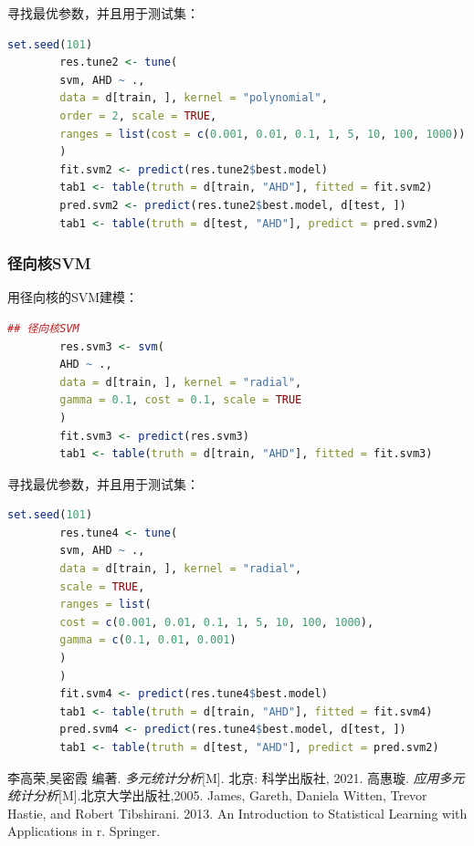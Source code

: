 \documentclass[12pt, a4paper, oneside]{ctexart}
\begin{document}
	寻找最优参数，并且用于测试集：
	\begin{lstlisting}[language=R]
		set.seed(101)
		res.tune2 <- tune(
		svm, AHD ~ .,
		data = d[train, ], kernel = "polynomial",
		order = 2, scale = TRUE,
		ranges = list(cost = c(0.001, 0.01, 0.1, 1, 5, 10, 100, 1000))
		)
		fit.svm2 <- predict(res.tune2$best.model)
		tab1 <- table(truth = d[train, "AHD"], fitted = fit.svm2)
		pred.svm2 <- predict(res.tune2$best.model, d[test, ])
		tab1 <- table(truth = d[test, "AHD"], predict = pred.svm2)
	\end{lstlisting}
	
	\subsubsection{径向核SVM}
	
	用径向核的SVM建模：
	\begin{lstlisting}[language=R]
		## 径向核SVM
		res.svm3 <- svm(
		AHD ~ .,
		data = d[train, ], kernel = "radial",
		gamma = 0.1, cost = 0.1, scale = TRUE
		)
		fit.svm3 <- predict(res.svm3)
		tab1 <- table(truth = d[train, "AHD"], fitted = fit.svm3)
	\end{lstlisting}
	
	寻找最优参数，并且用于测试集：
	\begin{lstlisting}[language=R]
		set.seed(101)
		res.tune4 <- tune(
		svm, AHD ~ .,
		data = d[train, ], kernel = "radial",
		scale = TRUE,
		ranges = list(
		cost = c(0.001, 0.01, 0.1, 1, 5, 10, 100, 1000),
		gamma = c(0.1, 0.01, 0.001)
		)
		)
		fit.svm4 <- predict(res.tune4$best.model)
		tab1 <- table(truth = d[train, "AHD"], fitted = fit.svm4)
		pred.svm4 <- predict(res.tune4$best.model, d[test, ])
		tab1 <- table(truth = d[test, "AHD"], predict = pred.svm2)
	\end{lstlisting}
	\newpage
	
	\begin{thebibliography}{99}
		李高荣,吴密霞 编著. \emph{多元统计分析}[M]. 北京: 科学出版社, 2021.
		高惠璇. \emph{应用多元统计分析}[M].北京大学出版社,2005.
		James, Gareth, Daniela Witten, Trevor Hastie, and Robert Tibshirani. 2013. An Introduction to Statistical Learning with Applications in r. Springer.
	\end{thebibliography}
	
	\newpage
	
\end{document}
